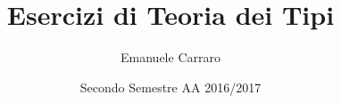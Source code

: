 \author{Emanuele Carraro}

\title{Esercizi di Teoria dei Tipi}
\date{Secondo Semestre AA 2016/2017}
\maketitle

\newpage
\tableofcontents